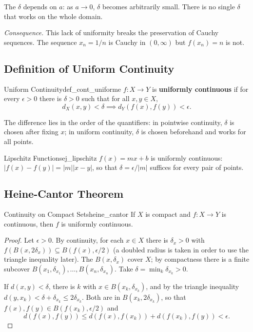 \documentclass[11pt, a4paper]{article}
\begin{document}
The $\delta$ depends on $a$: as $a \to 0$, $\delta$ becomes arbitrarily small. There is no
single $\delta$ that works on the whole domain.

\textit{Consequence.} This lack of uniformity breaks the preservation of Cauchy sequences. The
sequence $x_n = 1/n$ is Cauchy in $(0, \infty)$ but $f(x_n) = n$ is not.

\subsection{Definition of Uniform Continuity}

\begin{definicion}{Uniform Continuity}{def_cont_uniforme}
$f: X \to Y$ is \textbf{uniformly continuous} if for every $\epsilon > 0$ there is $\delta > 0$ such that for
all $x, y \in X$,
$$ d_X(x, y) < \delta \implies d_Y(f(x), f(y)) < \epsilon. $$
\end{definicion}

The difference lies in the order of the quantifiers: in pointwise continuity, $\delta$ is chosen
after fixing $x$; in uniform continuity, $\delta$ is chosen beforehand and works for all points.

\begin{ejemplo}{Lipschitz Functions}{ej_lipschitz}
$f(x) = mx + b$ is uniformly continuous: $|f(x) - f(y)| = |m||x-y|$, so that
$\delta = \epsilon/|m|$ suffices for every pair of points.
\end{ejemplo}

\subsection{Heine-Cantor Theorem}

\begin{teorema}{Continuity on Compact Sets}{heine_cantor}
If $X$ is compact and $f: X \to Y$ is continuous, then $f$ is uniformly continuous.
\end{teorema}

\begin{proof}
Let $\epsilon > 0$. By continuity, for each $x \in X$ there is $\delta_x > 0$ with
$f(B(x, 2\delta_x)) \subseteq B(f(x), \epsilon/2)$ (a doubled radius is taken in order to use the triangle inequality
later). The $B(x, \delta_x)$ cover $X$; by compactness there is a finite subcover
$B(x_1, \delta_{x_1}), \dots, B(x_n, \delta_{x_n})$. Take $\delta = \min_k \delta_{x_k} > 0$.

If $d(x, y) < \delta$, there is $k$ with $x \in B(x_k, \delta_{x_k})$, and by the triangle inequality
$d(y, x_k) < \delta + \delta_{x_k} \le 2\delta_{x_k}$. Both are in $B(x_k, 2\delta_{x_k})$,
so that $f(x), f(y) \in B(f(x_k), \epsilon/2)$ and
$$ d(f(x), f(y)) \le d(f(x), f(x_k)) + d(f(x_k), f(y)) < \epsilon. $$
\end{proof}
\end{document}
